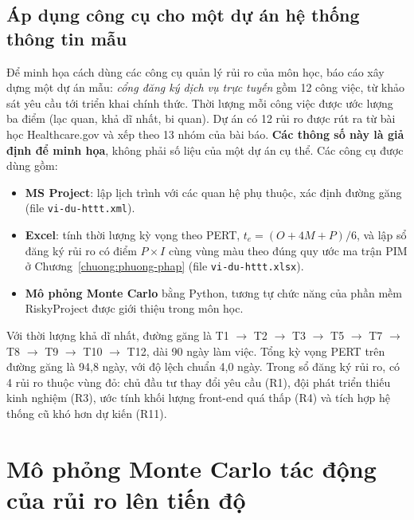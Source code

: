 \subsection{Áp dụng công cụ cho một dự án hệ thống thông tin mẫu}

Để minh họa cách dùng các công cụ quản lý rủi ro của môn học, báo cáo xây dựng một dự án mẫu: \emph{cổng đăng ký dịch vụ trực tuyến} gồm 12 công việc, từ khảo sát yêu cầu tới triển khai chính thức. Thời lượng mỗi công việc được ước lượng ba điểm (lạc quan, khả dĩ nhất, bi quan). Dự án có 12 rủi ro được rút ra từ bài học Healthcare.gov và xếp theo 13 nhóm của bài báo. \textbf{Các thông số này là giả định để minh họa}, không phải số liệu của một dự án cụ thể. Các công cụ được dùng gồm:
\begin{itemize}
  \item \textbf{MS Project}: lập lịch trình với các quan hệ phụ thuộc, xác định đường găng (file \texttt{vi-du-httt.xml}).
  \item \textbf{Excel}: tính thời lượng kỳ vọng theo PERT, $t_e = (O + 4M + P)/6$, và lập sổ đăng ký rủi ro có điểm $P \times I$ cùng vùng màu theo đúng quy ước ma trận PIM ở Chương~\ref{chuong:phuong-phap} (file \texttt{vi-du-httt.xlsx}).
  \item \textbf{Mô phỏng Monte Carlo} bằng Python, tương tự chức năng của phần mềm RiskyProject được giới thiệu trong môn học.
\end{itemize}

Với thời lượng khả dĩ nhất, đường găng là T1 $\to$ T2 $\to$ T3 $\to$ T5 $\to$ T7 $\to$ T8 $\to$ T9 $\to$ T10 $\to$ T12, dài 90 ngày làm việc. Tổng kỳ vọng PERT trên đường găng là 94,8 ngày, với độ lệch chuẩn 4,0 ngày. Trong sổ đăng ký rủi ro, có 4 rủi ro thuộc vùng đỏ: chủ đầu tư thay đổi yêu cầu (R1), đội phát triển thiếu kinh nghiệm (R3), ước tính khối lượng front-end quá thấp (R4) và tích hợp hệ thống cũ khó hơn dự kiến (R11).

\section{Mô phỏng Monte Carlo tác động của rủi ro lên tiến độ}
\label{sec:monte-carlo}

